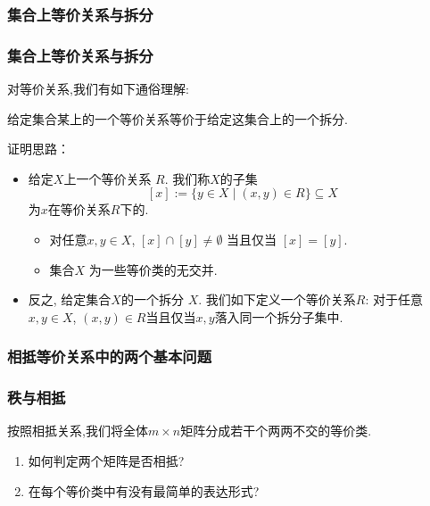 \subsubsection{集合上等价关系与拆分}
\begin{frame}\frametitle{集合上等价关系与拆分}
对等价关系,我们有如下通俗理解:
\begin{theorem}
给定集合某上的一个等价关系等价于给定这集合上的一个拆分.
\end{theorem}
\pp 证明思路：
\begin{itemize}
\item 给定$X$上一个等价关系 $R$. 我们称$X$的子集
\[[x]:=\{y\in X\mid (x,y)\in R\} \subseteq X\]
为$x$在等价关系$R$下的. \pp
\begin{itemize}
\item 对任意$x,y\in X$, $[x]\cap[y]\neq\emptyset$ 当且仅当 $[x]=[y]$. \pp
\item 集合$X$ 为一些等价类的无交并. \pp
\end{itemize}
\item 反之, 给定集合$X$的一个拆分 $X$. 我们如下定义一个等价关系$R$: 对于任意$x,y\in X$, $(x,y)\in R$当且仅当$x,y$落入同一个拆分子集中.
\end{itemize}
\end{frame}



\subsubsection{相抵等价关系中的两个基本问题}
\begin{frame}\frametitle{秩与相抵}

\pp
按照相抵关系,我们将全体$m\times n$矩阵分成若干个两两不交的等价类. \pp

\begin{enumerate}
\item 如何判定两个矩阵是否相抵? \pp
\item 在每个等价类中有没有最简单的表达形式?
\end{enumerate}

\end{frame}




